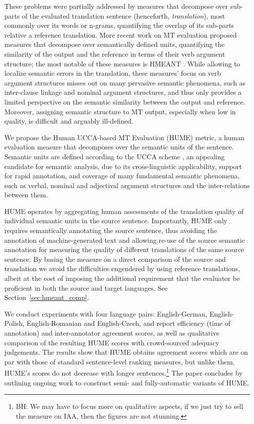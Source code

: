 \documentclass[11pt]{article}
\newcommand{\secref}[1]{Section~\ref{#1}}
\newcommand{\bh}[1]{\footnote{\color{blue}BH: #1}}
\begin{document}
These problems were partially addressed by measures that decompose over sub-parts of the evaluated
translation sentence (henceforth, {\it translation}),
most commonly over its words or n-grams,
quantifying the overlap of its sub-parts relative a reference translation.
More recent work on MT evaluation proposed measures
that decompose over semantically defined units,
quantifying the similarity of the output and the reference in terms of
their verb argument structure; the most notable of these measures is
HMEANT \cite{lo2011structured}.
While allowing to localize semantic errors in the translation,
these measures' focus on verb argument structures misses out on many pervasive semantic phenomena,
such as inter-clause linkage and nominal argument structures, and thus only provides
a limited perspective on the semantic similarity between the output and reference.
Moreover, assigning semantic structure to MT output, especially when low in quality,
is difficult and arguably ill-defined.

We propose the Human UCCA-based MT Evaluation (HUME) metric,
a human evaluation measure that decomposes over the semantic units of the sentence.
Semantic units are defined according to the 
UCCA scheme \cite{abend2013universal}, an appealing candidate for semantic analysis,
due to its cross-linguistic applicability, support for rapid annotation, and coverage
of many fundamental semantic phenomena, such as verbal, nominal and adjectival
argument structures and the inter-relations between them.

HUME operates by aggregating human assessments of the translation quality of individual
semantic units in the source sentence.
Importantly, HUME only requires semantically annotating the source sentence,
thus avoiding the annotation of machine-generated text 
and allowing re-use of the source semantic annotation for measuring the quality
of different translations of the same source sentence.
By basing the measure on a direct comparison
of the source and translation we avoid the difficulties engendered by using
reference translations, albeit at the cost of imposing the additional requirement
that the evaluator be proficient in both the source and target languages.
See \secref{sec:hmeant_comp}.

We conduct experiments with four language pairs: English-German, English-Polish,
English-Romanian and English-Czech, and report efficiency (time of annotation) and
inter-annotator agreement scores, as well as qualitative comparison of the resulting
HUME scores with crowd-sourced adequacy judgements. The results show that HUME obtains 
agreement scores which are on par with those of standard sentence-level ranking measures,
but unlike them, HUME's scores do not decrease with longer sentences.\bh{We may
  have to focus more on qualitative aspects, if we just try to sell
  the measure on IAA, then the figures are not stunning.}
The paper concludes by outlining ongoing work to construct semi- and
fully-automatic variants of HUME.
\end{document}
